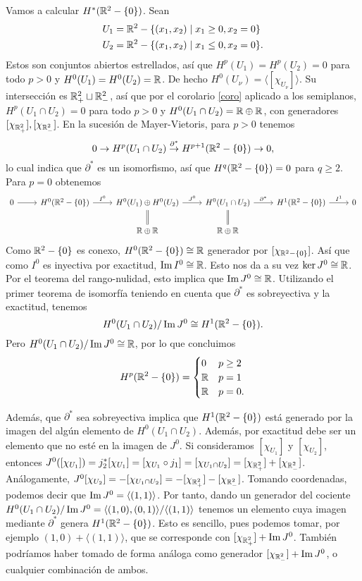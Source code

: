 \documentclass[CV.tex]{subfiles}
\begin{document}
\begin{ej}\label{menospunto}
Vamos a calcular $H^*(\mathbb{R}^2-\{0\})$. Sean
\begin{align*}
&U_1=\mathbb{R}^2-\{(x_1,x_2)\mid x_1\geq 0, x_2=0\}\\
&U_2=\mathbb{R}^2-\{(x_1,x_2)\mid x_1\leq 0, x_2=0\}.
\end{align*}
Estos son conjuntos abiertos estrellados, así que $H^p(U_1)=H^p(U_2)=0$ para todo $p>0$ y $H^0(U_1)=H^0(U_2)=\mathbb{R}$. De hecho $H^0(U_{\nu})=\langle [\chi_{U_{\nu}}]\rangle$. Su intersección es $\mathbb{R}^2_+\sqcup\mathbb{R}^2_-$, así que por el corolario \ref{coro} aplicado a los semiplanos, $H^p(U_1\cap U_2)=0$ para todo $p>0$ y $H^0(U_1\cap U_2)=\mathbb{R}\oplus\mathbb{R}$, con generadores $[\chi_{\mathbb{R}^2_+}],[\chi_{\mathbb{R}^2_-}]$. En la sucesión de Mayer-Vietoris, para $p>0$ tenemos
\[
0\to H^p(U_1\cap U_2)\overset{\partial^*}{\to} H^{p+1}(\mathbb{R}^2-\{0\})\to 0,
\]
lo cual indica que $\partial^*$ es un isomorfismo, así que $H^{q}(\mathbb{R}^2-\{0\})=0$ para $q\geq 2$. Para $p=0$ obtenemos
\[
\begin{tikzcd}
0\arrow[r] & H^0(\R^2-\{0\})\arrow[r,"I^0"] & H^0(U_1)\oplus H^0(U_2)\arrow[r, "J^0"]\arrow[d,equals] & H^0(U_1\cap U_2)\arrow[r,"\partial^*"]\arrow[d, equals] & H^1(\R^2-\{0\})\arrow[r,"I^1"] & 0\\
 & & \R\oplus\R &\R\oplus\R & & 
\end{tikzcd}
\]
Como $\mathbb{R}^2-\{0\}$ es conexo, $H^0(\mathbb{R}^2-\{0\})\cong\mathbb{R}$ generador por $[\chi_{\mathbb{R}^2-\{0\}}]$. Así que como $I^0$ es inyectiva por exactitud, $\operatorname{Im}{I^0}\cong\mathbb{R}$. Esto nos da a su vez $\ker{J^0}\cong\mathbb{R}$. Por el teorema del rango-nulidad, esto implica que $\operatorname{Im}{J^0}\cong\mathbb{R}$. Utilizando el primer teorema de isomorfía teniendo en cuenta que $\partial^*$ es sobreyectiva y la exactitud, tenemos
\[
H^0(U_1\cap U_2)/\operatorname{Im}{J^0}\cong H^1(\mathbb{R}^2-\{0\}).
\]
Pero $H^0(U_1\cap U_2)/\operatorname{Im}{J^0}\cong\mathbb{R}$, por lo que concluimos
\[
H^p(\mathbb{R}^2-\{0\})=\begin{cases}
0 & p\geq 2\\
\mathbb{R} & p=1\\
\mathbb{R} & p=0.
\end{cases}
\]

Además, que $\partial^*$ sea sobreyectiva implica que $H^1(\mathbb{R}^2-\{0\})$ está generado por la imagen del algún elemento de $H^0(U_1\cap U_2)$. Además, por exactitud debe ser un elemento que no esté en la imagen de $J^0$. Si consideramos $[\chi_{U_1}]$ y $[\chi_{U_2}]$, entonces $J^0([\chi_{U_1}])=j_2^*[\chi_{U_1}]=[\chi_{U_1}\circ j_1]=[\chi_{U_1\cap U_2}]=[\chi_{\mathbb{R}^2_+}]+[\chi_{\mathbb{R}^2_-}]$. Análogamente, $J^0[\chi_{U_2}]=-[\chi_{U_1\cap U_2}]=-[\chi_{\mathbb{R}^2_+}]-[\chi_{\mathbb{R}^2_-}]$. Tomando coordenadas, podemos decir que $\operatorname{Im}{J^0}=\langle (1,1)\rangle$. Por tanto, dando un generador del cociente $H^0(U_1\cap U_2)/\operatorname{Im}{J^0}=\langle (1,0),(0,1)\rangle/\langle (1,1)\rangle$ tenemos un elemento cuya imagen mediante $\partial^*$ genera $H^1(\mathbb{R}^2-\{0\})$. Esto es sencillo, pues podemos tomar, por ejemplo $(1,0)+\langle (1,1)\rangle$, que se corresponde con $[\chi_{\mathbb{R}^2_+}]+\operatorname{Im}{J^0}$. También podríamos haber tomado de forma análoga como generador $[\chi_{\mathbb{R}^2_-}]+\operatorname{Im}{J^0}$, o cualquier combinación de ambos.
\end{ej}
\end{document}
